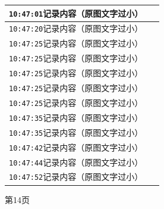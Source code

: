 \documentclass[UTF8,10pt,a4paper,fontset=fandol]{ctexart}
\newcommand{\fieldvalue}[1]{#1}
\begin{document}
\begin{minipage}[t]{0.48\linewidth}
\begin{tabular}{|p{0.20\linewidth}|p{0.72\linewidth}|}
\multicolumn{2}{|l|}{
\fieldvalue{\texttt{10:47:01}\quad 记录内容（原图文字过小）}} \\ \hline
\multicolumn{2}{|l|}{
\fieldvalue{\texttt{10:47:20}\quad 记录内容（原图文字过小）}} \\ \hline
\multicolumn{2}{|l|}{
\fieldvalue{\texttt{10:47:25}\quad 记录内容（原图文字过小）}} \\ \hline
\multicolumn{2}{|l|}{
\fieldvalue{\texttt{10:47:25}\quad 记录内容（原图文字过小）}} \\ \hline
\multicolumn{2}{|l|}{
\fieldvalue{\texttt{10:47:25}\quad 记录内容（原图文字过小）}} \\ \hline
\multicolumn{2}{|l|}{
\fieldvalue{\texttt{10:47:25}\quad 记录内容（原图文字过小）}} \\ \hline
\multicolumn{2}{|l|}{
\fieldvalue{\texttt{10:47:25}\quad 记录内容（原图文字过小）}} \\ \hline
\multicolumn{2}{|l|}{
\fieldvalue{\texttt{10:47:35}\quad 记录内容（原图文字过小）}} \\ \hline
\multicolumn{2}{|l|}{
\fieldvalue{\texttt{10:47:35}\quad 记录内容（原图文字过小）}} \\ \hline
\multicolumn{2}{|l|}{
\fieldvalue{\texttt{10:47:42}\quad 记录内容（原图文字过小）}} \\ \hline
\multicolumn{2}{|l|}{
\fieldvalue{\texttt{10:47:44}\quad 记录内容（原图文字过小）}} \\ \hline
\multicolumn{2}{|l|}{
\fieldvalue{\texttt{10:47:52}\quad 记录内容（原图文字过小）}} \\ \hline
\end{tabular}

\vspace{2pt}
第14页
\end{minipage}

\vspace{8pt}
\end{document}
